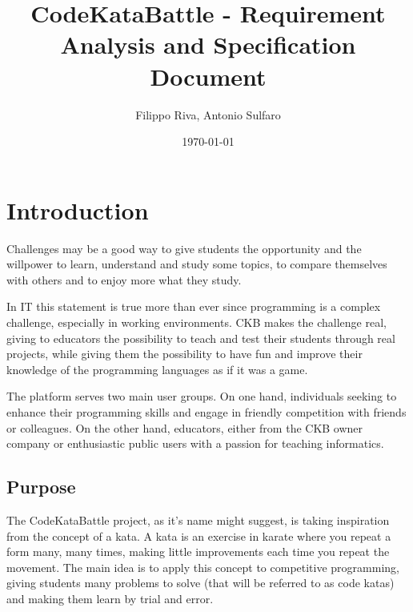 \documentclass[11pt]{report}
\title{CodeKataBattle - Requirement Analysis and Specification Document}
\author{Filippo Riva, Antonio Sulfaro}
\date{\today}
\begin{document}
\maketitle

\tableofcontents

\cleardoublepage












\chapter{Introduction}
    Challenges may be a good way to give students the opportunity and the willpower to learn,
    understand and study some topics, to compare themselves with others and to enjoy more
    what they study.

    In IT this statement is true more than ever since programming is a complex challenge,
    especially in working environments.
    CKB makes the challenge real, giving to educators the possibility to teach 
    and test their students through real projects, while giving them the possibility to have fun
    and improve their knowledge of the programming languages as if it was a game.

    The platform serves two main user groups.
    On one hand, individuals seeking to enhance their programming skills and engage in friendly competition with friends or colleagues.
    On the other hand, educators, either from the CKB owner company or enthusiastic public users with a passion for
    teaching informatics.

    \section{Purpose} \label{purpose}
    The CodeKataBattle project, as it's name might suggest, is taking inspiration from the concept 
    of a kata.
    A kata is an exercise in karate where you repeat a form many, many times, making
    little improvements each time you repeat the movement.
    The main idea is to apply this concept to competitive programming, giving students many
    problems to solve (that will be referred to as code katas) and making them learn by trial and error.
\end{document}
